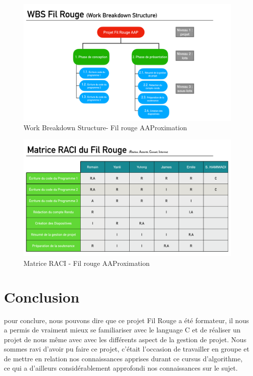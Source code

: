 \documentclass{article} %
\begin{document}
\begin{figure}[H]
  \begin{center}
    \includegraphics[scale=0.23]{Img_gdp/WBS.pdf}
  \end{center}
  \caption{Work Breakdown Structure- Fil rouge AAProximation}
  \label{fig:WBS}
\end{figure}


\begin{figure}[H]
  \begin{center}
    \includegraphics[scale=0.23]{Img_gdp/Matrice-RACI.pdf}
  \end{center}
  \caption{Matrice RACI - Fil rouge AAProximation}
  \label{fig:RACI}
\end{figure}




\section{Conclusion}

pour conclure, nous pouvons dire que ce projet Fil Rouge a été formateur, il nous a permis de vraiment mieux se familiariser avec le language C et de réaliser un projet de nous même avec avec les différents aspect de la gestion de projet. Nous sommes ravi d’avoir pu faire ce projet, c’était l’occasion de travailler en groupe et de mettre en relation nos connaissances apprises durant ce cursus d'algorithme, ce qui a d’ailleurs considérablement approfondi nos connaissances sur le sujet. 



\nocite{*}



\end{document}
